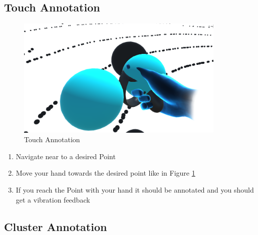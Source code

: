 \documentclass[notitlepage]{article}
\begin{document}
\subsection{Touch Annotation}

\begin{figure}[H]
   \centering
	\includegraphics[width=10cm]{TouchLabeling}%
    \caption{Touch Annotation}\label{fig:TouchAnnotation}%
\end{figure}

\qquad
\begin{enumerate}
\item Navigate near to a desired Point \\
\item Move your hand towards the desired point like in Figure \ref{fig:TouchAnnotation}\\
\item If you reach the Point with your hand it should be annotated and you should get a vibration feedback
\end{enumerate} 

\bigskip
\bigskip
\bigskip
\subsection{Cluster Annotation}
\end{document}
